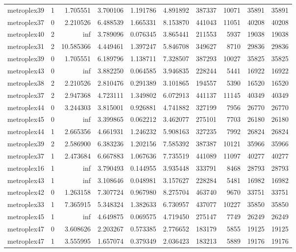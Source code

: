 \begin{longtable}{|l|r|r|r|r|r|r|r|r|r|}
metroplex39 & 1 & 1.705551 & 3.700106 & 1.191786 & 4.891892 & 387337 & 10071 & 35891 & 35891 \\
metroplex37 & 0 & 2.210526 & 6.488539 & 1.665331 & 8.153870 & 441043 & 11051 & 40208 & 40208 \\
metroplex40 & 2 & inf & 3.789096 & 0.076345 & 3.865441 & 211553 & 5937 & 19038 & 19038 \\
metroplex31 & 2 & 10.585366 & 4.449461 & 1.397247 & 5.846708 & 349627 & 8710 & 29836 & 29836 \\
metroplex39 & 0 & 1.705551 & 6.189796 & 1.138711 & 7.328507 & 387293 & 10027 & 35825 & 35825 \\
metroplex43 & 0 & inf & 3.882250 & 0.064585 & 3.946835 & 228244 & 5441 & 16922 & 16922 \\
metroplex38 & 2 & 2.210526 & 2.810476 & 0.291389 & 3.101865 & 194557 & 5390 & 16520 & 16520 \\
metroplex37 & 2 & 2.947368 & 4.723111 & 1.349802 & 6.072913 & 441137 & 11145 & 40349 & 40349 \\
metroplex44 & 0 & 3.244303 & 3.815001 & 0.926881 & 4.741882 & 327199 & 7956 & 26770 & 26770 \\
metroplex45 & 0 & inf & 3.399865 & 0.062212 & 3.462077 & 275101 & 7703 & 26180 & 26180 \\
metroplex44 & 1 & 2.665356 & 4.661931 & 1.246232 & 5.908163 & 327235 & 7992 & 26824 & 26824 \\
metroplex39 & 2 & 2.586900 & 6.383236 & 1.202156 & 7.585392 & 387387 & 10121 & 35966 & 35966 \\
metroplex37 & 1 & 2.473684 & 6.667883 & 1.067636 & 7.735519 & 441089 & 11097 & 40277 & 40277 \\
metroplex16 & 1 & inf & 3.790493 & 0.144955 & 3.935448 & 333791 & 8468 & 28793 & 28793 \\
metroplex43 & 1 & inf & 3.108646 & 0.048981 & 3.157627 & 228284 & 5481 & 16982 & 16982 \\
metroplex42 & 0 & 1.263158 & 7.307724 & 0.967980 & 8.275704 & 463740 & 9670 & 33751 & 33751 \\
metroplex33 & 1 & 7.365915 & 5.348324 & 1.382633 & 6.730957 & 437077 & 10227 & 35850 & 35850 \\
metroplex45 & 1 & inf & 4.649875 & 0.069575 & 4.719450 & 275147 & 7749 & 26249 & 26249 \\
metroplex47 & 0 & 3.608626 & 2.203267 & 0.573385 & 2.776652 & 183179 & 5855 & 19125 & 19125 \\
metroplex47 & 1 & 3.555995 & 1.657074 & 0.379349 & 2.036423 & 183213 & 5889 & 19176 & 19176 \\

\end{longtable}
